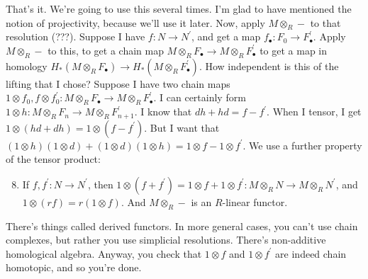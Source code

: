 That's it. We're going to use this several times. I'm glad to have mentioned the notion of projectivity, because we'll use it later. Now, apply $M\otimes_R -$ to that resolution (???). Suppose I have $f:N\to N^\prime$, and get a map $f_\bullet:F_0\to F^\prime_\bullet$. Apply $M\otimes_R -$ to this, to get a chain map $M\otimes_R F_\bullet\to M\otimes_R F^\prime_\bullet$ to get a map in homology $ H_\ast(M\otimes_R F_\bullet)\to H_\ast(M\otimes_R F^\prime_\bullet)$. How independent is this of the lifting that I chose? Suppose I have two chain maps $1\otimes f_0,f\otimes f_0^\prime:M\otimes_R F_\bullet\to M\otimes_R F^\prime_\bullet$. I can certainly form $1\otimes h:M\otimes_R F_n\to M\otimes_R F^\prime_{n+1}$. I know that $dh+hd=f-f^\prime$. When I tensor, I get $1\otimes(hd+dh)=1\otimes(f-f^\prime)$. But I want that $(1\otimes h)(1\otimes d)+(1\otimes d)(1\otimes h)=1\otimes f-1\otimes f^\prime$. We use a further property of the tensor product:
\begin{enumerate}
\setcounter{enumi}{7}
\item If $f,f^\prime:N\to N^\prime$, then $1\otimes(f+f^\prime)=1\otimes f+1\otimes f^\prime:M\otimes_R N\to M\otimes_R N^\prime$, and $1\otimes(rf)=r(1\otimes f)$. And $M\otimes_R -$ is an $R$-linear functor. 
\end{enumerate}
There's things called derived functors. In more general cases, you can't use chain complexes, but rather you use simplicial resolutions. There's non-additive homological algebra. Anyway, you check that $1\otimes f$ and $1\otimes f^\prime$ are indeed chain homotopic, and so you're done.

